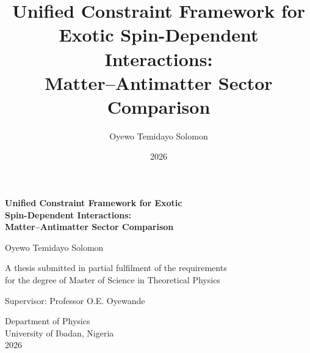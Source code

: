 \documentclass[12pt,a4paper]{report}
\title{Unified Constraint Framework for Exotic Spin-Dependent Interactions:\\
Matter--Antimatter Sector Comparison}
\author{Oyewo Temidayo Solomon}
\date{2026}
\begin{document}
\begin{titlepage}
\centering
\vspace*{2cm}

{\LARGE \bfseries Unified Constraint Framework for Exotic\\[0.3em]
Spin-Dependent Interactions:\\[0.3em]
Matter--Antimatter Sector Comparison\par}

\vspace{2.5cm}

{\Large Oyewo Temidayo Solomon\par}

\vspace{1.5cm}

{\large A thesis submitted in partial fulfilment of the requirements\\
for the degree of Master of Science in Theoretical Physics\par}

\vspace{2cm}

{\large Supervisor: Professor O.E. Oyewande\par}

\vfill

{\large Department of Physics\\
University of Ibadan, Nigeria\\
2026\par}

\end{titlepage}

\tableofcontents








\appendix

\end{document}
